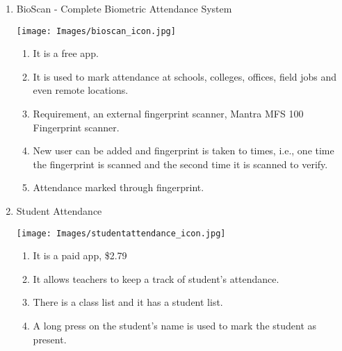 \begin{enumerate}
   \item BioScan - Complete Biometric Attendance System
   \begin{center}
       \texttt{[image: Images/bioscan\_icon.jpg]}
   \end{center}
   \begin{enumerate}
       \item It is a free app.
       \item It is used to mark attendance at schools, colleges, offices, field jobs and even remote locations.
       \item Requirement, an external fingerprint scanner, Mantra MFS 100 Fingerprint scanner.
       \item New user can be added and fingerprint is taken to times, i.e., one time the fingerprint is scanned and the second time it is scanned to verify.
       \item Attendance marked through fingerprint.
   \end{enumerate}
   
   \item Student Attendance
   \begin{center}
       \texttt{[image: Images/studentattendance\_icon.jpg]}
   \end{center}
   \begin{enumerate}
       \item It is a paid app, \$2.79
       \item It allows teachers to keep a track of student’s attendance.
       \item There is a class list and it has a student list.
       \item A long press on the student’s name is used to mark the student as present.
   \end{enumerate}
   
\end{enumerate}